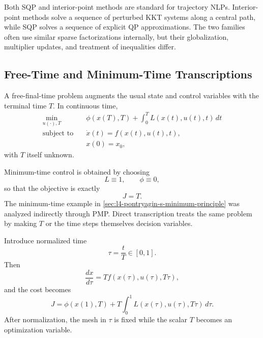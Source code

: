 \begin{remark}
	Both SQP and interior-point methods are standard for trajectory NLPs. Interior-point methods solve a sequence of perturbed KKT systems along a central path, while SQP solves a sequence of explicit QP approximations. The two families often use similar sparse factorizations internally, but their globalization, multiplier updates, and treatment of inequalities differ.
\end{remark}

\subsection{Free-Time and Minimum-Time Transcriptions}
\label{sec:l5-free-time-and-minimum-time-transcriptions}

\begin{definition}\label{def:l5-free-final-time-optimal-control-problem}
	A free-final-time problem augments the usual state and control variables with the terminal time $T$. In continuous time,
	\begin{align*}
		\min_{u(\cdot),T} \quad & \phi(x(T),T)+\int_{0}^{T}L(x(t),u(t),t)\,dt \\
		\text{subject to}\quad & \dot x(t)=f(x(t),u(t),t), \\
		                       & x(0)=x_0,
	\end{align*}
	with $T$ itself unknown.
\end{definition}

\begin{remark}
	Minimum-time control is obtained by choosing
	\[
		L \equiv 1,
		\qquad
		\phi \equiv 0,
	\]
	so that the objective is exactly
	\[
		J=T.
	\]
	The minimum-time example in \autoref{sec:l4-pontryagin-s-minimum-principle} was analyzed indirectly through PMP. Direct transcription treats the same problem by making $T$ or the time steps themselves decision variables.
\end{remark}

\begin{definition}\label{def:l5-time-normalization-for-free-time-transcription}
	Introduce normalized time
	\[
		\tau=\frac{t}{T}\in[0,1].
	\]
	Then
	\[
		\frac{dx}{d\tau}=T f(x(\tau),u(\tau),T\tau),
	\]
	and the cost becomes
	\[
		J
		=
		\phi(x(1),T)
		+
		T\int_{0}^{1}L(x(\tau),u(\tau),T\tau)\,d\tau.
	\]
	After normalization, the mesh in $\tau$ is fixed while the scalar $T$ becomes an optimization variable.
\end{definition}

